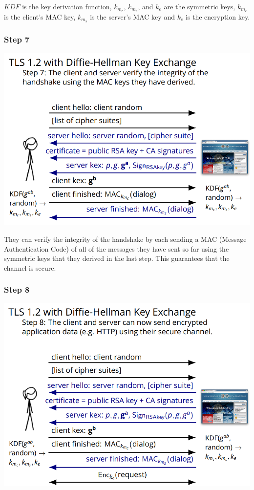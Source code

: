 \documentclass[11pt]{article} %
\begin{document}
{\noindent $KDF$ is the key derivation function,
$k_{m_c}$, $k_{m_s}$, and $k_{e}$ are the symmetric keys,
$k_{m_c}$ is the client's MAC key, $k_{m_s}$ is the server's MAC key and $k_{e}$ 
is the encryption key.

\subsubsection{Step 7}

\begin{center}
	\includegraphics[scale=.8]{./DiffieStep7.png}
\end{center}

\noindent They can verify the integrity of the handshake by each sending a MAC (Message 
Authentication Code) of all of the messages they have sent so far using the 
symmetric keys that they derived in the last step. This guarantees that the channel is secure.

\subsubsection{Step 8}

\begin{center}
	\includegraphics[scale=.8]{./DiffieStep8.png}
\end{center}

}
\end{document}
